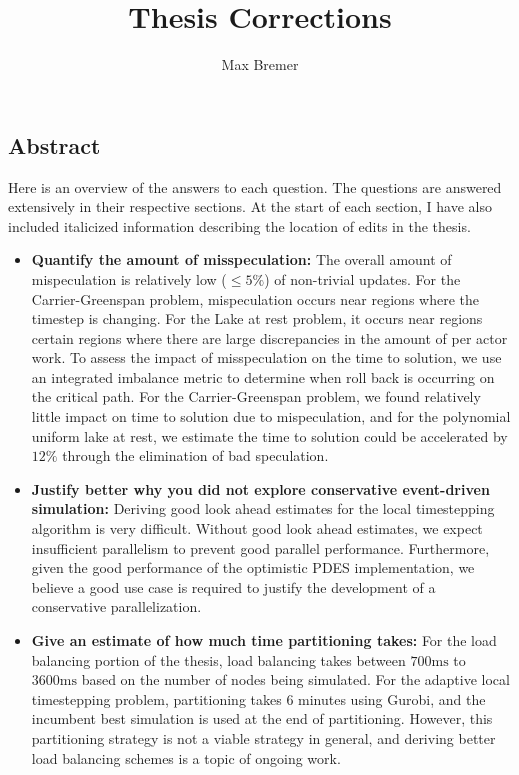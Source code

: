 \documentclass[10pt,letterpaper]{article}
\title{Thesis Corrections}
\author{Max Bremer}
\begin{document}
\maketitle

\subsection*{Abstract}
Here is an overview of the answers to each question. The questions are answered extensively in their respective sections. At the start of each section, I have also included italicized information describing the location of edits in the thesis.
\begin{itemize}
\item {\bf Quantify the amount of misspeculation:} The overall amount of mispeculation is relatively low ($\le 5\%$) of non-trivial updates. For the Carrier-Greenspan problem, mispeculation occurs near regions where the timestep is changing. For the Lake at rest problem, it occurs near regions certain regions where there are large discrepancies in the amount of per actor work. To assess the impact of misspeculation on the time to solution, we use an integrated imbalance metric to determine when roll back is occurring on the critical path. For the Carrier-Greenspan problem, we found relatively  little impact on time to solution due to mispeculation, and for the polynomial uniform lake at rest, we estimate the time to solution could be accelerated by $12\%$ through the elimination of bad speculation.
\item {\bf Justify better why you did not explore conservative event-driven simulation:} Deriving good look ahead estimates for the local timestepping algorithm is very difficult. Without good look ahead estimates, we expect insufficient parallelism to prevent good parallel performance. Furthermore, given the good performance of the optimistic PDES implementation, we believe a good use case is required to justify the development of a conservative parallelization.
\item {\bf Give an estimate of how much time partitioning takes:} For the load balancing portion of the thesis, load balancing takes between $700 \mathrm{ms}$ to $3600 \mathrm{ms}$ based on the number of nodes being simulated. For the adaptive local timestepping problem, partitioning takes 6 minutes using Gurobi, and the incumbent best simulation is used at the end of partitioning. However, this partitioning strategy is not a viable strategy in general, and deriving better load balancing schemes is a topic of ongoing work.
\end{itemize}
\end{document}
